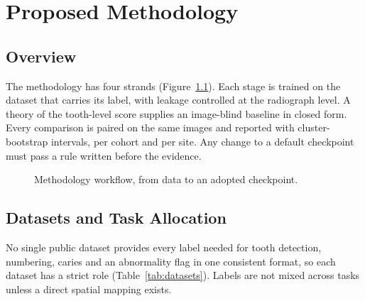\chapter{Proposed Methodology}
\label{ch:method}

\section{Overview}

The methodology has four strands (Figure~\ref{fig:methodflow}). Each stage is trained on the dataset
that carries its label, with leakage controlled at the radiograph level. A theory of the tooth-level
score supplies an image-blind baseline in closed form. Every comparison is paired on the same images
and reported with cluster-bootstrap intervals, per cohort and per site. Any change to a default
checkpoint must pass a rule written before the evidence.

\begin{figure}[!htbp]
\centering

\caption[Methodology workflow]{Methodology workflow, from data to an adopted checkpoint.}
\label{fig:methodflow}
\end{figure}

\section{Datasets and Task Allocation}

No single public dataset provides every label needed for tooth detection, numbering, caries and an
abnormality flag in one consistent format, so each dataset has a strict role
(Table~\ref{tab:datasets}). Labels are not mixed across tasks unless a direct spatial mapping exists.

